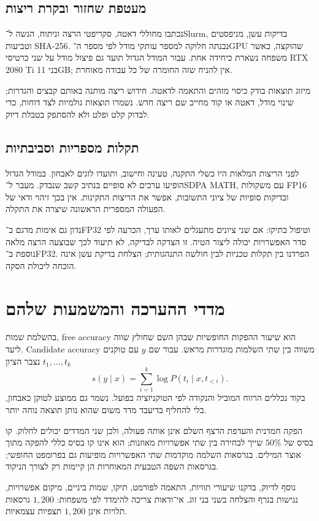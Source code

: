 \documentclass[11pt,a4paper]{article}
\newcommand{\en}[1]{\textenglish{#1}}
\begin{document}
\subsection{מעטפת שחזור ובקרת ריצות}
נכתבו מחוללי דאטה, סקריפטי הרצה וניתוח, הגשה ל־\en{Slurm}, בדיקות עשן, מניפסטים וטביעות \en{SHA-256}. נבנתה חלוקה למספר עותקי מודל לפי מספר ה־\en{GPU} שהוקצה, כאשר משפחה נשארת כיחידה אחת. עבור המודל הגדול תועד גם פיצול מודל על שני כרטיסי \en{RTX 2080 Ti} בני \en{11GB}; אין להניח שזה החומרה של כל עבודה מאוחרת.

מיזוג תוצאות בודק כיסוי מזהים והתאמה לדאטה. חידוש ריצה מותנה באותם קבצים והגדרות; שינוי מודל, דאטה או קוד מחייב שם ריצה חדש. נשמרו תוצאות גולמיות לצד דוחות, כדי לבדוק קלט ופלט ולא להסתפק בטבלת דיוק.

\subsection{תקלות מספריות וסביבתיות}
לפני הריצות המלאות היו כשלי התקנה, טעינה וחישוב, ותועדו לוגים לאבחון. במודל הגדול הופיעו ערכים לא סופיים בנתיב קשב שנבדק. מעבר ל־\en{SDPA MATH}, עם משקולות \en{FP16} ובדיקות סופיות של ציוני התשובות, אפשר את הריצות התקינות. אין בכך זיהוי ודאי של הפעולה המספרית הראשונה שיצרה את התקלה.

נדון גם אימות מדגם ב־\en{FP32} וטיפול בתיקו: אם שני ציונים מתעגלים לאותו ערך, הכרעה לפי סדר האפשרויות יכולה ליצור הטיה. זו הצדקה לבדיקה, לא תיעוד לכך שבוצעה הרצה מלאה נוספת ב־\en{FP32}. הפרדנו בין תקלות טכניות לבין חולשה התנהגותית; הצלחת בדיקת עשן אינה הוכחה ליכולת הסקה.

\section{מדדי ההערכה והמשמעות שלהם}
בהשלמת שמות, \en{free accuracy} הוא שיעור ההפקות החופשיות שבהן השם שחולץ שווה ליעד. \en{Candidate accuracy} משווה בין שתי השלמות מוגדרות מראש. עבור שם $y$ עם טוקנים $t_1,\ldots,t_k$ נצבר הציון
\[
 s(y\mid x)=\sum_{i=1}^{k}\log P(t_i\mid x,t_{<i}).
\]
בקוד נכללים הרווח המוביל והנקודה לפי הטוקניזציה בפועל. נשמר גם ממוצע לטוקן כאבחון, בלי להחליף בדיעבד מדד משום שהוא נותן תוצאה נוחה יותר.

הפקה חמדנית והעדפת הרצף השלם אינן אותה פעולה, ולכן שני המדדים יכולים לחלוק. קו בסיס של $50\%$ שייך לבחירה בין שתי אפשרויות מאוזנות; הוא אינו קו בסיס כללי להפקה מתוך אוצר המילים. בגרסאות השלמה מוקדמות שתי האפשרויות מופיעות גם בפרומפט החופשי; בגרסאות השפה הטבעית המאוחרות הן קיימות רק לצורך הניקוד.

נוסף לדיוק, בדקנו שיעורי תוויות, התאמה לפורמט, תיקו, שמות ביניים, מיקום אפשרויות, נגישות בגרף והצלחה בשני בני זוג. אי־ודאות צריכה להימדד לפי משפחות: $1{,}200$ גרסאות תלויות אינן $1{,}200$ תצפיות עצמאיות.
\end{document}
